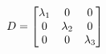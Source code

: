 \documentclass[preview]{standalone}
\begin{document}
\begin{align*}
\special{dvisvgm:raw <g id='unique000'>}D = \begin{bmatrix} \lambda_1 & 0 & 0 \\ 0 & \lambda_2 & 0 \\ 0 & 0 & \lambda_3 \end{bmatrix}\special{dvisvgm:raw </g>}
\end{align*}
\end{document}
